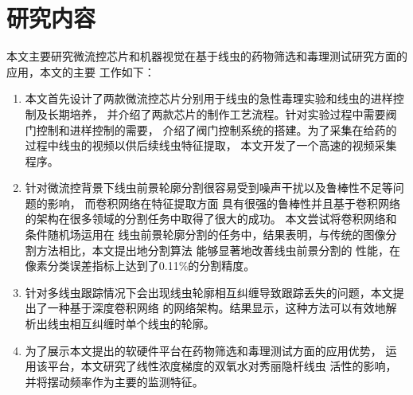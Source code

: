 \section{研究内容}
\label{sec:intro:org}
	本文主要研究微流控芯片和机器视觉在基于线虫的药物筛选和毒理测试研究方面的应用，本文的主要
	工作如下：
	\begin{enumerate}
	  \item 本文首先设计了两款微流控芯片分别用于线虫的急性毒理实验和线虫的进样控制及长期培养，
	  并介绍了两款芯片的制作工艺流程。针对实验过程中需要阀门控制和进样控制的需要，
	  介绍了阀门控制系统的搭建。为了采集在给药的过程中线虫的视频以供后续线虫特征提取，
	  本文开发了一个高速的视频采集程序。
	  \item 针对微流控背景下线虫前景轮廓分割很容易受到噪声干扰以及鲁棒性不足等问题的影响，
	  而卷积网络在特征提取方面
	  具有很强的鲁棒性并且基于卷积网络的架构在很多领域的分割任务中取得了很大的成功。
	  本文尝试将卷积网络和条件随机场运用在
	  线虫前景轮廓分割的任务中，结果表明，与传统的图像分割方法相比，本文提出地分割算法
	  能够显著地改善线虫前景分割的
	  性能，在像素分类误差指标上达到了0.11\%的分割精度。
	  \item 针对多线虫跟踪情况下会出现线虫轮廓相互纠缠导致跟踪丢失的问题，本文提出了一种基于深度卷积网络
	  的网络架构。结果显示，这种方法可以有效地解析出线虫相互纠缠时单个线虫的轮廓。
	  \item 为了展示本文提出的软硬件平台在药物筛选和毒理测试方面的应用优势，
	  运用该平台，本文研究了线性浓度梯度的双氧水对秀丽隐杆线虫
	  活性的影响，并将摆动频率作为主要的监测特征。
	\end{enumerate}
	
